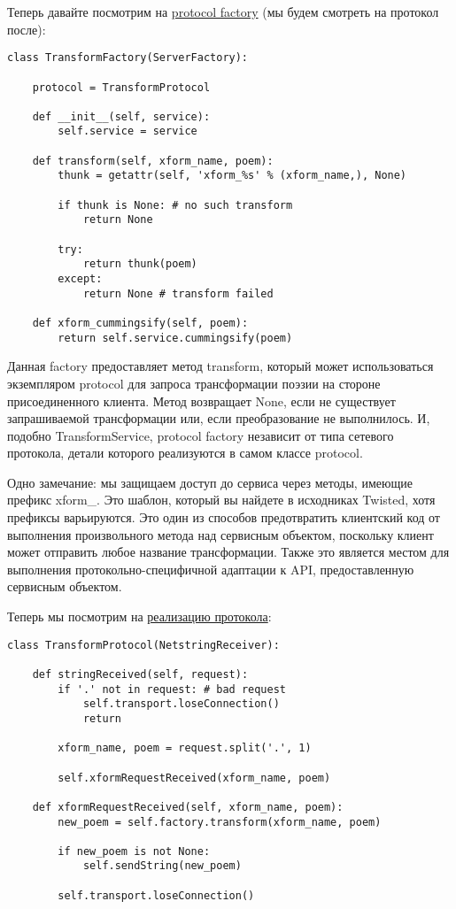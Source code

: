 Теперь давайте посмотрим на 
\href{http://github.com/jdavisp3/twisted-intro/blob/master/twisted-server-1/tranformedpoetry.py#L67}{protocol factory} (мы будем смотреть на протокол после):

 \begin{verbatim}
class TransformFactory(ServerFactory):

    protocol = TransformProtocol

    def __init__(self, service):
        self.service = service

    def transform(self, xform_name, poem):
        thunk = getattr(self, 'xform_%s' % (xform_name,), None)

        if thunk is None: # no such transform
            return None

        try:
            return thunk(poem)
        except:
            return None # transform failed

    def xform_cummingsify(self, poem):
        return self.service.cummingsify(poem)
\end{verbatim} 


Данная factory предоставляет метод transform, который 
может использоваться экземпляром protocol для запроса 
трансформации поэзии на стороне присоединенного клиента. 
Метод возвращает None, если не существует запрашиваемой 
трансформации или, если преобразование не выполнилось. И, 
подобно TransformService, protocol factory независит от 
типа сетевого протокола, детали которого реализуются в самом 
классе protocol. 


Одно замечание: мы защищаем доступ до сервиса через 
методы, имеющие префикс xform\_. Это шаблон, который 
вы найдете в исходниках Twisted, хотя префиксы 
варьируются. Это один из способов предотвратить 
клиентский код от выполнения произвольного метода 
над сервисным объектом, поскольку клиент может отправить 
любое название трансформации. Также это является 
местом для выполнения протокольно-специфичной адаптации к 
API, предоставленную сервисным объектом. 


Теперь мы посмотрим на 
\href{http://github.com/jdavisp3/twisted-intro/blob/master/twisted-server-1/tranformedpoetry.py#L47}{реализацию протокола}:

 \begin{verbatim}
class TransformProtocol(NetstringReceiver):

    def stringReceived(self, request):
        if '.' not in request: # bad request
            self.transport.loseConnection()
            return

        xform_name, poem = request.split('.', 1)

        self.xformRequestReceived(xform_name, poem)

    def xformRequestReceived(self, xform_name, poem):
        new_poem = self.factory.transform(xform_name, poem)

        if new_poem is not None:
            self.sendString(new_poem)

        self.transport.loseConnection()
\end{verbatim} 

